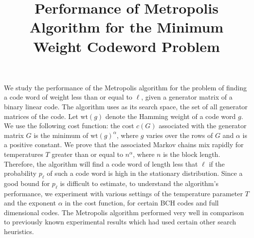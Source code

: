 \documentclass[12pt]{article}
\title{Performance of Metropolis Algorithm for the Minimum Weight Codeword Problem}
\begin{document}
\maketitle 

We study the performance of the Metropolis algorithm for the problem
of finding a code word of weight less than or equal to $\ell$, given a
generator matrix of a binary linear code. The algorithm uses as its
search space, the set of all generator matrices of the code. Let
$\mathrm{wt}(g)$ denote the Hamming weight of a code word $g$. We use
the following cost function: the cost $c(G)$ associated with the
generator matrix $G$ is the minimum of $\mathrm{wt}(g)^\alpha$, where
$g$ varies over the rows of $G$ and $\alpha$ is a positive constant.
We prove that the associated Markov chains mix rapidly for
temperatures $T$ greater than or equal to $n^\alpha$, where $n$ is the
block length. Therefore, the algorithm will find a code word of length
less that $\ell$ if the probability $p_\ell$ of such a code word is
high in the stationary distribution. Since a good bound for $p_\ell$
is difficult to estimate, to understand the algorithm's performance,
we experiment with various settings of the temperature parameter $T$
and the exponent $\alpha$ in the cost function, for certain BCH codes
and full dimensional codes. The Metropolis algorithm performed very
well in comparison to previously known experimental results which had
used certain other search heuristics.
\end{document}
